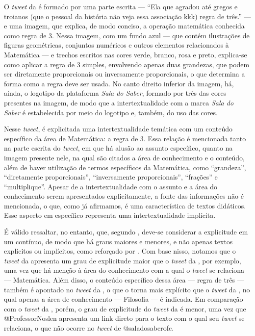\documentclass{textolivre}
\begin{document}
O \textit{tweet} da  é formado por uma parte escrita — “Ela que agradou até gregos e troianos (que o pessoal da história não veja essa associação kkk) regra de três.” — e uma imagem, que explica, de modo conciso, a operação matemática conhecida como regra de 3. Nessa imagem, com um fundo azul — que contém ilustrações de figuras geométricas, conjuntos numéricos e outros elementos relacionados à Matemática — e trechos escritos nas cores verde, branco, rosa e preto, explica-se como aplicar a regra de 3 simples, envolvendo apenas duas grandezas, que podem ser diretamente proporcionais ou inversamente proporcionais, o que determina a forma como a regra deve ser usada. No canto direito inferior da imagem, há, ainda, o logotipo da plataforma \textit{Sala do Saber}, formado por três das cores presentes na imagem, de modo que a intertextualidade com a marca \textit{Sala do Saber} é estabelecida por meio do logotipo e, também, do uso das cores.

Nesse \textit{tweet}, é explicitada uma intertextualidade temática com um conteúdo específico da área de Matemática: a regra de 3. Essa relação é mencionada tanto na parte escrita do \textit{tweet}, em que há alusão ao assunto específico, quanto na imagem presente nele, na qual são citados a área de conhecimento e o conteúdo, além de haver utilização de termos específicos da Matemática, como “grandeza”, “diretamente proporcionais”, “inversamente proporcionais”, “frações” e “multiplique”. Apesar de a intertextualidade com o assunto e a área do conhecimento serem apresentados explicitamente, a fonte das informações não é mencionada, o que, como já afirmamos, é uma característica de textos didáticos. Esse aspecto em específico representa uma intertextualidade implícita.

É válido ressaltar, no entanto, que, segundo \textcite{koch_intertextualidade:_2012}, deve-se considerar a explicitude em um contínuo, de modo que há graus maiores e menores, e não apenas textos explícitos ou implícitos, como reforçado por \textcite{mozdzenski_intertextualidade_2013}. Com base nisso, notamos que o \textit{tweet} da  apresenta um grau de explicitude maior que o \textit{tweet} da , por exemplo, uma vez que há menção à área do conhecimento com a qual o \textit{tweet} se relaciona — Matemática. Além disso, o conteúdo específico dessa área  — regra de três — também é apontado no \textit{tweet} da , o que o torna mais explícito que o \textit{tweet} da , no qual apenas a área de conhecimento — Filosofia — é indicada. Em comparação com o \textit{tweet} da , porém, o grau de explicitude do \textit{tweet} da  é menor, uma vez que @ProfessorNoslen apresenta um link direto para o texto com o qual seu \textit{tweet} se relaciona, o que não ocorre no \textit{tweet} de @saladosaberofc.
\end{document}
